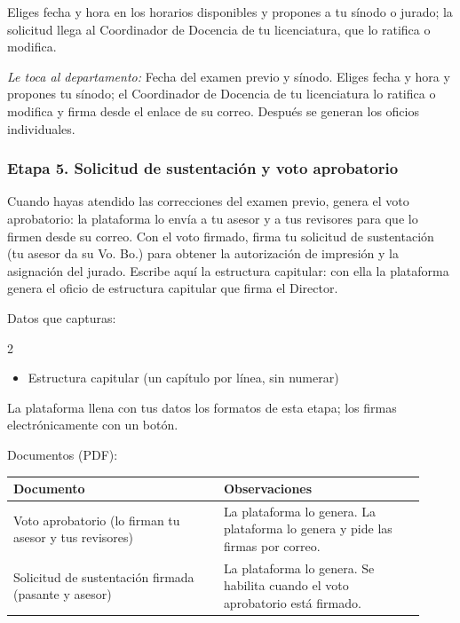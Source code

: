 Eliges fecha y hora en los horarios disponibles y propones a tu sínodo o jurado; la solicitud llega al Coordinador de Docencia de tu licenciatura, que lo ratifica o modifica.

\emph{Le toca al departamento:} Fecha del examen previo y sínodo. Eliges fecha y hora y propones tu sínodo; el Coordinador de Docencia de tu licenciatura lo ratifica o modifica y firma desde el enlace de su correo. Después se generan los oficios individuales.
\subsubsection*{Etapa 5. Solicitud de sustentación y voto aprobatorio}
Cuando hayas atendido las correcciones del examen previo, genera el voto aprobatorio: la plataforma lo envía a tu asesor y a tus revisores para que lo firmen desde su correo. Con el voto firmado, firma tu solicitud de sustentación (tu asesor da su Vo. Bo.) para obtener la autorización de impresión y la asignación del jurado. Escribe aquí la estructura capitular: con ella la plataforma genera el oficio de estructura capitular que firma el Director.

Datos que capturas:
\begin{multicols}{2}\small
\begin{itemize}
  \item Estructura capitular (un capítulo por línea, sin numerar)
\end{itemize}
\end{multicols}

La plataforma llena con tus datos los formatos de esta etapa; los firmas electrónicamente con un botón.

Documentos (PDF):
{\small\begin{longtable}{>{\raggedright\arraybackslash}p{0.47\linewidth}>{\raggedright\arraybackslash}p{0.45\linewidth}}
\toprule
\textbf{Documento} & \textbf{Observaciones}\\
\midrule
\endhead
Voto aprobatorio (lo firman tu asesor y tus revisores) & La plataforma lo genera. La plataforma lo genera y pide las firmas por correo.\\
Solicitud de sustentación firmada (pasante y asesor) & La plataforma lo genera. Se habilita cuando el voto aprobatorio está firmado.\\
\bottomrule
\end{longtable}}

